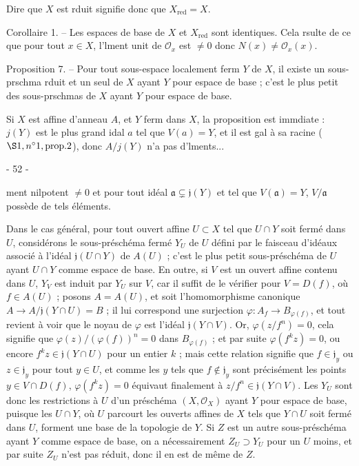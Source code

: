 Dire que $X$ est rduit signifie donc que $X_{\text{red}} = X$.

Corollaire 1. -- Les espaces de base de $X$ et $X_{\text{red}}$ sont identiques.
Cela rsulte de ce que pour tout $x \in X$, l'lment unit de $\mathcal{O}_x$ est $\neq 0$ donc $N(x) \neq \mathcal{O}_x(x)$.

Proposition 7. -- Pour tout sous-espace localement ferm $Y$ de $X$, il existe un sous-prschma rduit et un seul de $X$ ayant $Y$ pour espace de base ; c'est le plus petit des sous-prschmas de $X$ ayant $Y$ pour espace de base.

Si $X$ est affine d'anneau $A$, et $Y$ ferm dans $X$, la proposition est immdiate : $j(Y)$ est le plus grand idal $a$ tel que $V(a) = Y$, et il est gal \`a sa racine ($\S 1, n^\circ 1, \text{prop.} 2$), donc $A/j(Y)$ n'a pas d'lments...

\newpage


- 52 -

ment nilpotent $\neq 0$ et pour tout idéal $\mathfrak{a} \subsetneq \mathfrak{j}(Y)$ et tel que $V(\mathfrak{a}) = Y$, $V/\mathfrak{a}$ possède de tels éléments.

Dans le cas général, pour tout ouvert affine $U \subset X$ tel que $U \cap Y$ soit fermé dans $U$, considérons le sous-préschéma fermé $Y_U$ de $U$ défini par le faisceau d'idéaux associé à l'idéal $\mathfrak{j}(U \cap Y)$ de $A(U)$ ; c'est le plus petit sous-préschéma de $U$ ayant $U \cap Y$ comme espace de base. En outre, si $V$ est un ouvert affine contenu dans $U$, $Y_V$ est induit par $Y_U$ sur $V$, car il suffit de le vérifier pour $V=D(f)$, où $f \in A(U)$ ; posons $A=A(U)$, et soit l'homomorphisme canonique $A \to A/\mathfrak{j}(Y \cap U) = B$ ; il lui correspond une surjection $\varphi : A_f \to B_{\varphi(f)}$, et tout revient à voir que le noyau de $\varphi$ est l'idéal $\mathfrak{j}(Y \cap V)$. Or, $\varphi(z/f^n) = 0$, cela signifie que $\varphi(z)/(\varphi(f))^n = 0$ dans $B_{\varphi(f)}$ ; et par suite $\varphi(f^k z) = 0$, ou encore $f^k z \in \mathfrak{j}(Y \cap U)$ pour un entier $k$ ; mais cette relation signifie que $f \in \mathfrak{j}_y$ ou $z \in \mathfrak{j}_y$ pour tout $y \in U$, et comme les $y$ tels que $f \notin \mathfrak{j}_y$ sont précisément les points $y \in V \cap D(f)$, $\varphi(f^k z) = 0$ équivaut finalement à $z/f^n \in \mathfrak{j}(Y \cap V)$. Les $Y_U$ sont donc les restrictions à $U$ d'un préschéma $(X, \mathcal{O}_X)$ ayant $Y$ pour espace de base, puisque les $U \cap Y$, où $U$ parcourt les ouverts affines de $X$ tels que $Y \cap U$ soit fermé dans $U$, forment une base de la topologie de $Y$. Si $Z$ est un autre sous-préschéma ayant $Y$ comme espace de base, on a nécessairement $Z_U \supset Y_U$ pour un $U$ moins, et par suite $Z_U$ n'est pas réduit, donc il en est de même de $Z$.

